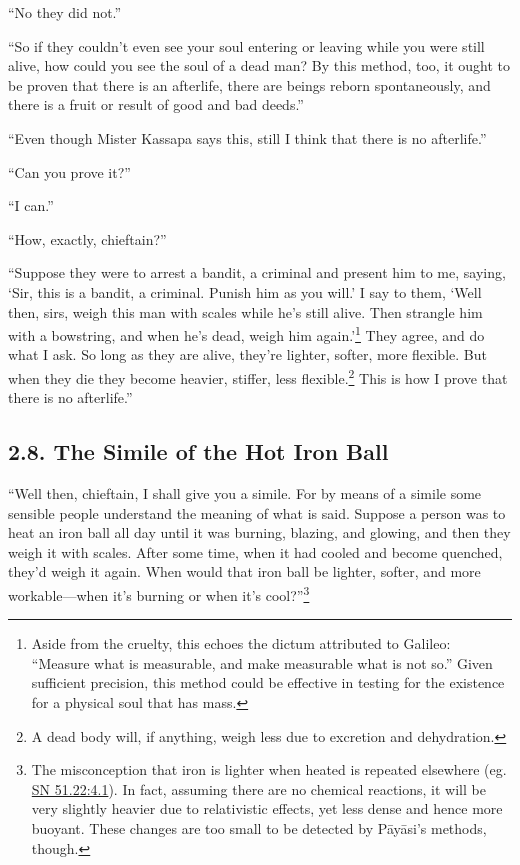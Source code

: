 \documentclass[12pt,openany]{book}%
\begin{document}
“No they did not.” 

“So if they couldn’t even see your soul entering or leaving while you were still alive, how could you see the soul of a dead man? By this method, too, it ought to be proven that there is an afterlife, there are beings reborn spontaneously, and there is a fruit or result of good and bad deeds.” 

“Even though Mister Kassapa says this, still I think that there is no afterlife.” 

“Can you prove it?” 

“I can.” 

“How, exactly, chieftain?” 

“Suppose they were to arrest a bandit, a criminal and present him to me, saying, ‘Sir, this is a bandit, a criminal. Punish him as you will.’ I say to them, ‘Well then, sirs, weigh this man with scales while he’s still alive. Then strangle him with a bowstring, and when he’s dead, weigh him again.’\footnote{Aside from the cruelty, this echoes the dictum attributed to Galileo: “Measure what is measurable, and make measurable what is not so.” Given sufficient precision, this method could be effective in testing for the existence for a physical soul that has mass. } They agree, and do what I ask. So long as they are alive, they’re lighter, softer, more flexible. But when they die they become heavier, stiffer, less flexible.\footnote{A dead body will, if anything, weigh less due to excretion and dehydration. } This is how I prove that there is no afterlife.” 

\subsection*{2.8. The Simile of the Hot Iron Ball }

“Well then, chieftain, I shall give you a simile. For by means of a simile some sensible people understand the meaning of what is said. Suppose a person was to heat an iron ball all day until it was burning, blazing, and glowing, and then they weigh it with scales. After some time, when it had cooled and become quenched, they’d weigh it again. When would that iron ball be lighter, softer, and more workable—when it’s burning or when it’s cool?”\footnote{The misconception that iron is lighter when heated is repeated elsewhere (eg. \href{https://suttacentral.net/sn51.22/en/sujato\#4.1}{SN 51.22:4.1}). In fact, assuming there are no chemical reactions, it will be very slightly heavier due to relativistic effects, yet less dense and hence more buoyant. These changes are too small to be detected by \textsanskrit{Pāyāsi}’s methods, though. } 
\end{document}
